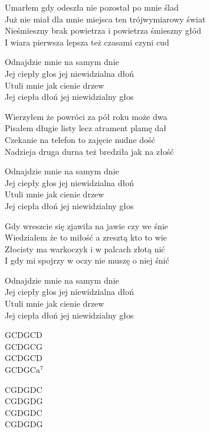 \begin{text}
    Umarłem gdy odeszła nie pozostał po mnie ślad\\
    Już nie miał dla mnie miejsca ten trójwymiarowy świat\\
    Nieśmieszny brak powietrza i powietrza śmieszny głód\\
    I wiara pierwsza lepsza też czasami czyni cud

    Odnajdzie mnie na samym dnie\\
    Jej ciepły głos jej niewidzialna dłoń\\
    Utuli mnie jak cienie drzew\\
    Jej ciepła dłoń jej niewidzialny głos

    Wierzyłem że powróci za pół roku może dwa\\
    Pisałem długie listy lecz atrament plamę dał\\
    Czekanie na telefon to zajęcie nudne dość\\
    Nadzieja druga durna też bredziła jak na złość

    Odnajdzie mnie na samym dnie\\
    Jej ciepły głos jej niewidzialna dłoń\\
    Utuli mnie jak cienie drzew\\
    Jej ciepła dłoń jej niewidzialny głos

    Gdy wreszcie się zjawiła na jawie czy we śnie\\
    Wiedziałem że to miłość a zresztą kto to wie\\
    Złocisty ma warkoczyk i w palcach złotą nić\\
    I gdy mi spojrzy w oczy nie muszę o niej śnić

    Odnajdzie mnie na samym dnie\\
    Jej ciepły głos jej niewidzialna dłoń\\
    Utuli mnie jak cienie drzew\\
    Jej ciepła dłoń jej niewidzialny głos
\end{text}
\begin{chord}
    GCDGCD\\
    GCDGCG\\
    GCDGCD\\
    GCDGC$\mathrm{a^7}$

    CGDGDC\\
    CGDGDG\\
    CGDGDC\\
    CGDGDG
\end{chord}

